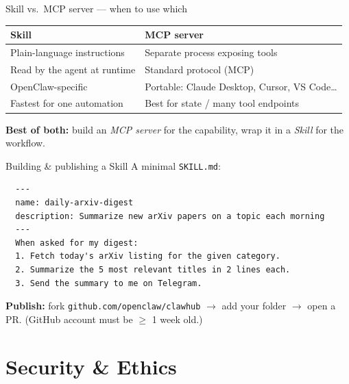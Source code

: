 \documentclass[aspectratio=169,11pt]{beamer}
\begin{document}
\begin{frame}{Skill vs.\ MCP server — when to use which}
  \centering
  \renewcommand{\arraystretch}{1.3}
  \begin{tabular}{l l}
    \toprule
    \textbf{Skill} & \textbf{MCP server} \\
    \midrule
    Plain-language instructions & Separate process exposing tools \\
    Read by the agent at runtime & Standard protocol (MCP) \\
    OpenClaw-specific & Portable: Claude Desktop, Cursor, VS Code\ldots \\
    Fastest for one automation & Best for state / many tool endpoints \\
    \bottomrule
  \end{tabular}
  \vspace{1.0em}
  \begin{center}
    \textcolor{clawOrange}{\textbf{Best of both:}} build an \emph{MCP server} for the capability,
    wrap it in a \emph{Skill} for the workflow.
  \end{center}
\end{frame}

\begin{frame}[fragile]{Building \& publishing a Skill}
  A minimal \texttt{SKILL.md}:
\begin{verbatim}
  ---
  name: daily-arxiv-digest
  description: Summarize new arXiv papers on a topic each morning
  ---
  When asked for my digest:
  1. Fetch today's arXiv listing for the given category.
  2. Summarize the 5 most relevant titles in 2 lines each.
  3. Send the summary to me on Telegram.
\end{verbatim}
  \textbf{Publish:} fork \texttt{github.com/openclaw/clawhub} $\to$ add your folder $\to$
  open a PR. \scriptsize(GitHub account must be $\geq$ 1 week old.)
\end{frame}

\section{Security \& Ethics}
\end{document}
